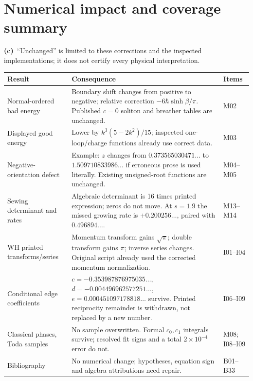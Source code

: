 \documentclass[11pt,a4paper]{article}
\newcommand{\C}{\textbf{(c)}\ }
\begin{document}
\section{Numerical impact and coverage summary}
\C ``Unchanged'' is limited to these corrections and the inspected
implementations; it does not certify every physical interpretation.
\begin{longtable}{@{}L{4.0cm}L{8.2cm}L{2.7cm}@{}}
\toprule Result & Consequence & Items\\\midrule\endhead
Normal-ordered bad energy & Boundary shift changes from positive to negative;
relative correction $-6\hbar\sinh\beta/\pi$. Published $c=0$ soliton and
breather tables are unchanged. & M02\\
Displayed good energy & Lower by $k^3(5-2k^2)/15$; inspected
one-loop/charge functions already use correct data. & M03\\
Negative-orientation defect & Example: $z$ changes from
$0.373565030471\ldots$ to $1.509710833986\ldots$ if erroneous prose is
used literally. Existing unsigned-root functions are unchanged. & M04--M05\\
Sewing determinant and rates & Algebraic determinant is 16 times
printed expression; zeros do not move. At $s=1.9$ the missed growing rate
is $+0.200256\ldots$, paired with $0.496894\ldots$. & M13--M14\\
WH printed transforms/series & Momentum transform gains $\sqrt\pi$; double
transform gains $\pi$; inverse series changes. Original script already
used the corrected momentum normalization. & I01--I04\\
Conditional edge coefficients & $c=-0.353987876975035\ldots$,
$d=-0.004496962577251\ldots$, $e=0.000451097178818\ldots$ survive.
Printed reciprocity remainder is withdrawn, not replaced by a new number.
& I06--I09\\
Classical phases, Toda samples & No sample overwritten. Formal
$c_0,c_1$ integrals survive; resolved fit signs and a total
$2\times10^{-4}$ error do not. & M08; I08--I09\\
Bibliography & No numerical change; hypotheses, equation sign and algebra
attributions need repair. & B01--B33\\
\bottomrule
\end{longtable}
\end{document}
